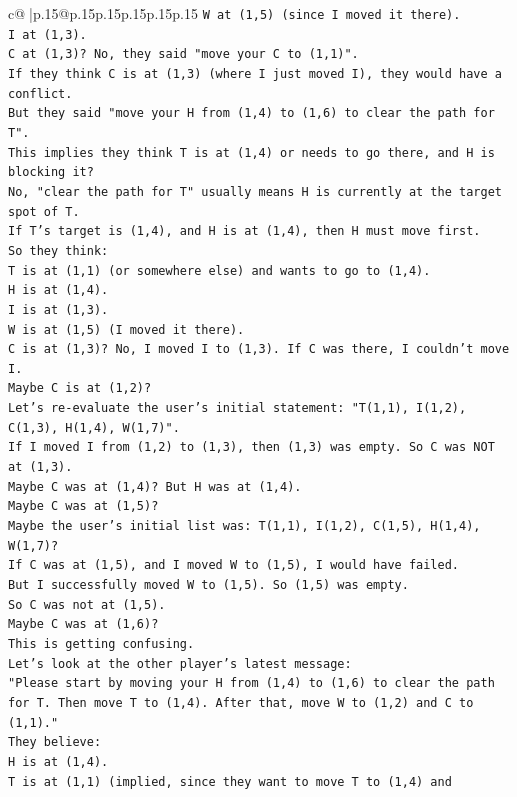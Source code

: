 \documentclass{article}
\begin{document}
{\begin{supertabular}{c@{$\;$}|p{.15\linewidth}@{}p{.15\linewidth}p{.15\linewidth}p{.15\linewidth}p{.15\linewidth}p{.15\linewidth}}
{{{\texttt{W at (1,5) (since I moved it there).} \\
\texttt{I at (1,3).} \\
\texttt{C at (1,3)? No, they said "move your C to (1,1)".} \\
\texttt{If they think C is at (1,3) (where I just moved I), they would have a conflict.} \\
\texttt{But they said "move your H from (1,4) to (1,6) to clear the path for T".} \\
\texttt{This implies they think T is at (1,4) or needs to go there, and H is blocking it?} \\
\texttt{No, "clear the path for T" usually means H is currently at the target spot of T.} \\
\texttt{If T's target is (1,4), and H is at (1,4), then H must move first.} \\
\texttt{So they think:} \\
\texttt{T is at (1,1) (or somewhere else) and wants to go to (1,4).} \\
\texttt{H is at (1,4).} \\
\texttt{I is at (1,3).} \\
\texttt{W is at (1,5) (I moved it there).} \\
\texttt{C is at (1,3)? No, I moved I to (1,3). If C was there, I couldn't move I.} \\
\texttt{Maybe C is at (1,2)?} \\
\texttt{Let's re{-}evaluate the user's initial statement: "T(1,1), I(1,2), C(1,3), H(1,4), W(1,7)".} \\
\texttt{If I moved I from (1,2) to (1,3), then (1,3) was empty. So C was NOT at (1,3).} \\
\texttt{Maybe C was at (1,4)? But H was at (1,4).} \\
\texttt{Maybe C was at (1,5)?} \\
\texttt{Maybe the user's initial list was: T(1,1), I(1,2), C(1,5), H(1,4), W(1,7)?} \\
\texttt{If C was at (1,5), and I moved W to (1,5), I would have failed.} \\
\texttt{But I successfully moved W to (1,5). So (1,5) was empty.} \\
\texttt{So C was not at (1,5).} \\
\texttt{Maybe C was at (1,6)?} \\
\texttt{This is getting confusing.} \\
\texttt{Let's look at the other player's latest message:} \\
\texttt{"Please start by moving your H from (1,4) to (1,6) to clear the path for T. Then move T to (1,4). After that, move W to (1,2) and C to (1,1)."} \\
\texttt{They believe:} \\
\texttt{H is at (1,4).} \\
\texttt{T is at (1,1) (implied, since they want to move T to (1,4) and} \\
            }
        }
    }
     \\ \\


\end{supertabular}}
\end{document}

